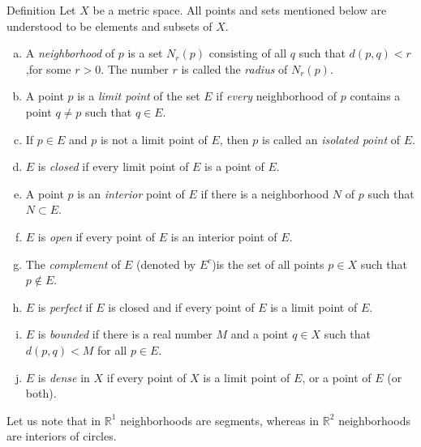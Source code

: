 \begin{myDef}\label{myDef:2.18}
    Definition Let $X$ be a metric space. All points and sets mentioned below are understood to be elements and subsets of $X$.
    \begin{enumerate}[(a)]
        \item A \emph{neighborhood} of $p$ is a set $N_r(p)$ consisting of all $q$ such that $d(p, q) < r$,for some $r > 0$. The number $r$ is called the \emph{radius} of $N_r(p)$.
        \item A point $p$ is a \emph{limit point} of the set $E$ if \emph{every} neighborhood of $p$ contains a point $q \neq p$ such that $q \in E$.
        \item If $p \in E$ and $p$ is not a limit point of $E$, then $p$ is called an \emph{isolated point} of $E$.
        \item $E$ is \emph{closed} if every limit point of $E$ is a point of $E$.
        \item A point $p$ is an \emph{interior} point of $E$ if there is a neighborhood $N$ of $p$ such that $N \subset E$.
        \item $E$ is \emph{open} if every point of $E$ is an interior point of $E$.
        \item The \emph{complement} of $E$ (denoted by $E^c$)is the set of all points $p \in X$ such that $p \not\in E$.
        \item $E$ is \emph{perfect} if $E$ is closed and if every point of $E$ is a limit point of $E$.
        \item $E$ is \emph{bounded} if there is a real number $M$ and a point $q \in X$ such that $d(p,q)< M$ for all $p \in E$.
        \item $E$ is \emph{dense} in $X$ if every point of $X$ is a limit point of $E$, or a point of $E$ (or both).
    \end{enumerate}
\end{myDef}

Let us note that in $\mathbb{R}^1$ neighborhoods are segments, whereas in $\mathbb{R}^2$ neighborhoods are interiors of circles.


